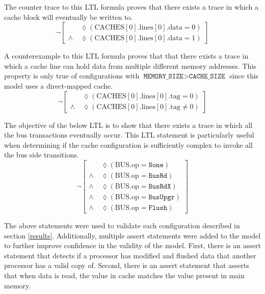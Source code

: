 \documentclass[12pt]{article}
\newcommand{\Eventually}{\lozenge}           %
\begin{document}
The counter trace to this LTL formula proves that there exists a trace in which a cache block will eventually be written to.
\begin{equation}
\neg \left[
\begin{aligned}
          & \Eventually(\text{CACHES}[0].\text{lines}[0].\text{data} = 0) \\
    \land\ & \Eventually(\text{CACHES}[0].\text{lines}[0].\text{data} = 1)
\end{aligned}
\right]
\end{equation}

A counterexample to this LTL formula proves that that there exists a trace in which a cache line can hold data from multiple different memory addresses. This property is only true of configurations with $\texttt{MEMORY\_SIZE} > \texttt{CACHE\_SIZE}$ since this model uses a direct-mapped cache.
\begin{equation}
\neg \left[
\begin{aligned}
          & \Eventually(\text{CACHES}[0].\text{lines}[0].\text{tag} = 0) \\
    \land\ & \Eventually(\text{CACHES}[0].\text{lines}[0].\text{tag} \neq 0)
\end{aligned}
\right]
\end{equation}

The objective of the below LTL is to show that there exists a trace in which all the bus transactions eventually occur. This LTL statement is particularly useful when determining if the cache configuration is sufficiently complex to invoke all the bus side transitions.
\begin{equation} \label{eq:valid_bus_op}
\neg \left[
\begin{aligned}
          & \Eventually(\text{BUS}.\text{op} = \texttt{None})      \\
    \land\ & \Eventually(\text{BUS}.\text{op} = \texttt{BusRd})   \\
    \land\ & \Eventually(\text{BUS}.\text{op} = \texttt{BusRdX})  \\
    \land\ & \Eventually(\text{BUS}.\text{op} = \texttt{BusUpgr}) \\
    \land\ & \Eventually(\text{BUS}.\text{op} = \texttt{Flush})
\end{aligned}
\right]
\end{equation}

The above statements were used to validate each configuration described in section \ref{results}. Additionally, multiple assert statements were added to the model to further improve confidence in the validity of the model. First, there is an assert statement that detects if a processor has modified and flushed data that another processor has a valid copy of. Second, there is an assert statement that asserts that when data is read, the value in cache matches the value present in main memory.
\end{document}
